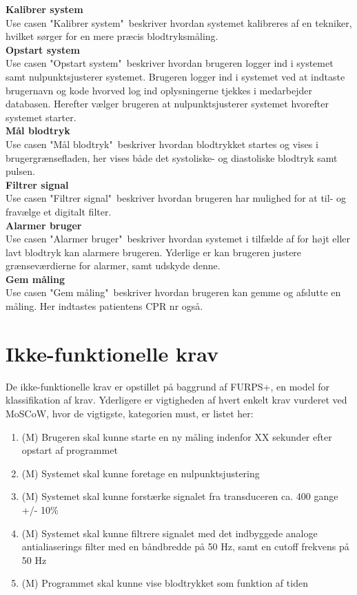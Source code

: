 \textbf{Kalibrer system}\\
Use casen "Kalibrer system"\ beskriver hvordan systemet kalibreres af en tekniker, hvilket sørger for en mere præcis blodtryksmåling.\\[1ex]
\textbf{Opstart system}\\
Use casen "Opstart system"\ beskriver hvordan brugeren logger ind i systemet samt nulpunktsjusterer systemet. Brugeren logger ind i systemet ved at indtaste brugernavn og kode hvorved log ind oplysningerne tjekkes i medarbejder databasen. Herefter vælger brugeren at nulpunktsjusterer systemet hvorefter systemet starter.\\[1ex]
\textbf{Mål blodtryk}\\
Use casen "Mål blodtryk"\ beskriver hvordan blodtrykket startes og vises i brugergrænsefladen, her vises både det systoliske- og diastoliske blodtryk samt pulsen.\\[1ex]
\textbf{Filtrer signal}\\
Use casen "Filtrer signal"\ beskriver hvordan brugeren har mulighed for at til- og fravælge et digitalt filter.\\[1ex]
\textbf{Alarmer bruger}\\
Use casen "Alarmer bruger"\ beskriver hvordan systemet i tilfælde af for højt eller lavt blodtryk kan alarmere brugeren. Yderlige er kan brugeren justere grænseværdierne for alarmer, samt udskyde denne.\\[1ex]
\textbf{Gem måling}\\
Use casen "Gem måling"\ beskriver hvordan brugeren kan gemme og afslutte en måling. Her indtastes patientens CPR nr også.

\section{Ikke-funktionelle krav}
De ikke-funktionelle krav er opstillet på baggrund af FURPS+, en model for klassifikation af krav. Yderligere er vigtigheden af hvert enkelt krav vurderet ved MoSCoW, hvor de vigtigste, kategorien must, er listet her:

\begin{enumerate}
	\item (M) Brugeren skal kunne starte en ny måling indenfor XX sekunder efter opstart af programmet 
	\item (M) Systemet skal kunne foretage en nulpunktsjustering
	\item (M) Systemet skal kunne forstærke signalet fra transduceren ca. 400 gange +/- 10\%
	\item (M) Systemet skal kunne filtrere signalet med det indbyggede analoge antialiaserings filter med en båndbredde på 50 Hz, samt en cutoff frekvens på 50 Hz
	\item (M) Programmet skal kunne vise blodtrykket som funktion af tiden
\end{enumerate}



